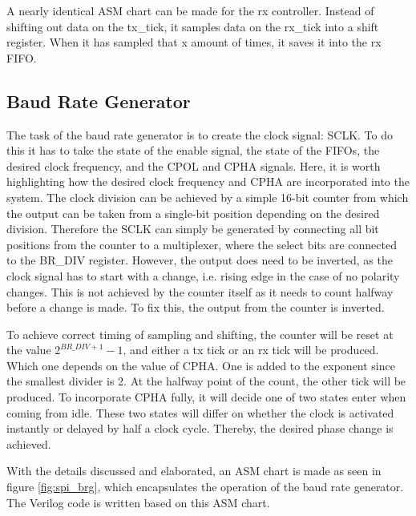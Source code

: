 \documentclass[./dissertation.tex]{subfiles}
\begin{document}
A nearly identical ASM chart can be made for the rx controller. Instead of shifting out data on the tx\_tick, it samples data on the rx\_tick into a shift register. When it has sampled that x amount of times, it saves it into the rx FIFO. 

\subsection{Baud Rate Generator}
The task of the baud rate generator is to create the clock signal: SCLK. To do this it has to take the state of the enable signal, the state of the FIFOs, the desired clock frequency, and the CPOL and CPHA signals. Here, it is worth highlighting how the desired clock frequency and CPHA are incorporated into the system. The clock division can be achieved by a simple 16-bit counter from which the output can be taken from a single-bit position depending on the desired division. Therefore the SCLK can simply be generated by connecting all bit positions from the counter to a multiplexer, where the select bits are connected to the BR\_DIV register. However, the output does need to be inverted, as the clock signal has to start with a change, i.e. rising edge in the case of no polarity changes. This is not achieved by the counter itself as it needs to count halfway before a change is made. To fix this, the output from the counter is inverted. 

To achieve correct timing of sampling and shifting, the counter will be reset at the value $2^{BR\_DIV+1}-1$, and either a tx tick or an rx tick will be produced. Which one depends on the value of CPHA. One is added to the exponent since the smallest divider is 2. At the halfway point of the count, the other tick will be produced. To incorporate CPHA fully, it will decide one of two states enter when coming from idle. These two states will differ on whether the clock is activated instantly or delayed by half a clock cycle. Thereby, the desired phase change is achieved.  

With the details discussed and elaborated, an ASM chart is made as seen in figure \ref{fig:spi_brg}, which encapsulates the operation of the baud rate generator. The Verilog code is written based on this ASM chart.    
\end{document}

